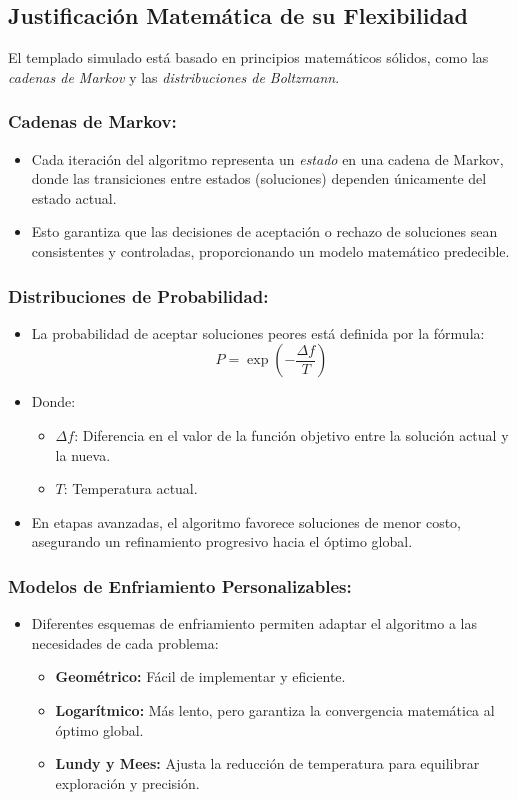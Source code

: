 \documentclass{article}
\begin{document}
\subsection{Justificación Matemática de su Flexibilidad}

El templado simulado está basado en principios matemáticos sólidos, como las \textit{cadenas de Markov} y las \textit{distribuciones de Boltzmann}.

\subsubsection{Cadenas de Markov:}
\begin{itemize}
    \item Cada iteración del algoritmo representa un \textit{estado} en una cadena de Markov, donde las transiciones entre estados (soluciones) dependen únicamente del estado actual.
    \item Esto garantiza que las decisiones de aceptación o rechazo de soluciones sean consistentes y controladas, proporcionando un modelo matemático predecible.
\end{itemize}

\subsubsection{Distribuciones de Probabilidad:}
\begin{itemize}
    \item La probabilidad de aceptar soluciones peores está definida por la fórmula:
    \[
    P = \exp\left(-\frac{\Delta f}{T}\right)
    \]
    \item Donde:
    \begin{itemize}
        \item $\Delta f$: Diferencia en el valor de la función objetivo entre la solución actual y la nueva.
        \item $T$: Temperatura actual.
    \end{itemize}
    \item En etapas avanzadas, el algoritmo favorece soluciones de menor costo, asegurando un refinamiento progresivo hacia el óptimo global.
\end{itemize}

\subsubsection{Modelos de Enfriamiento Personalizables:}
\begin{itemize}
    \item Diferentes esquemas de enfriamiento permiten adaptar el algoritmo a las necesidades de cada problema:
    \begin{itemize}
        \item \textbf{Geométrico:} Fácil de implementar y eficiente.
        \item \textbf{Logarítmico:} Más lento, pero garantiza la convergencia matemática al óptimo global.
        \item \textbf{Lundy y Mees:} Ajusta la reducción de temperatura para equilibrar exploración y precisión.
    \end{itemize}
\end{itemize}
\end{document}
